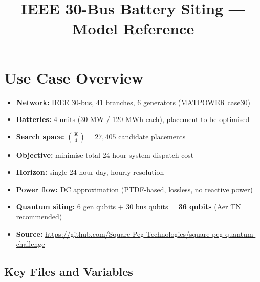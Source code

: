 \documentclass[11pt,a4paper]{article}
\title{\textbf{IEEE 30-Bus Battery Siting --- Model Reference}}
\author{}
\date{}
\begin{document}
\maketitle
\tableofcontents
\newpage

\section{Use Case Overview}

\begin{itemize}
  \item \textbf{Network:} IEEE 30-bus, 41 branches, 6 generators (MATPOWER case30)
  \item \textbf{Batteries:} 4 units (30 MW / 120 MWh each), placement to be optimised
  \item \textbf{Search space:} $\binom{30}{4} = 27{,}405$ candidate placements
  \item \textbf{Objective:} minimise total 24-hour system dispatch cost
  \item \textbf{Horizon:} single 24-hour day, hourly resolution
  \item \textbf{Power flow:} DC approximation (PTDF-based, lossless, no reactive power)
  \item \textbf{Quantum siting:} 6 gen qubits + 30 bus qubits = \textbf{36 qubits} (Aer TN recommended)
  \item \textbf{Source:} \url{https://github.com/Square-Peg-Technologies/square-peg-quantum-challenge}
\end{itemize}

\subsection*{Key Files and Variables}
\end{document}

